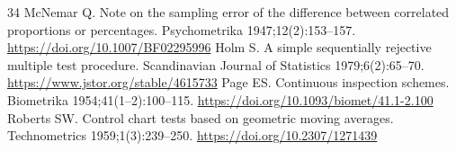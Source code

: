\documentclass[a4paper,fleqn,doubleblind]{cas-dc}
\begin{document}
\begin{thebibliography}{34}
 McNemar Q. Note on the sampling error of the difference between correlated proportions or percentages. Psychometrika 1947;12(2):153--157. \url{https://doi.org/10.1007/BF02295996}
 Holm S. A simple sequentially rejective multiple test procedure. Scandinavian Journal of Statistics 1979;6(2):65--70. \url{https://www.jstor.org/stable/4615733}
 Page ES. Continuous inspection schemes. Biometrika 1954;41(1--2):100--115. \url{https://doi.org/10.1093/biomet/41.1-2.100}
 Roberts SW. Control chart tests based on geometric moving averages. Technometrics 1959;1(3):239--250. \url{https://doi.org/10.2307/1271439}
\end{thebibliography}
\end{document}
